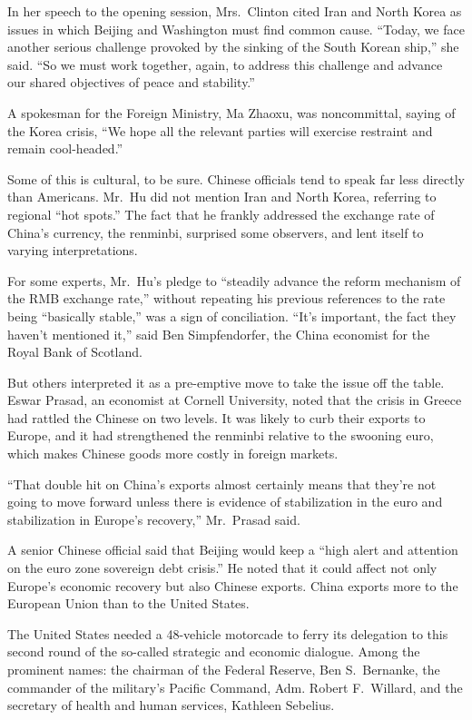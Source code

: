 ﻿\documentclass[12pt]{article}
\begin{document}
In her speech to the opening session, Mrs.~Clinton cited Iran and North Korea as issues in which
Beijing and Washington must find common cause. ``Today, we face another serious challenge provoked
by the sinking of the South Korean ship,'' she said. ``So we must work together, again, to address
this challenge and advance our shared objectives of peace and stability.''

A spokesman for the Foreign Ministry, Ma Zhaoxu, was noncommittal, saying of the Korea crisis, ``We
hope all the relevant parties will exercise restraint and remain cool-headed.''

Some of this is cultural, to be sure. Chinese officials tend to speak far less directly than
Americans. Mr.~Hu did not mention Iran and North Korea, referring to regional ``hot spots.'' The
fact that he frankly addressed the exchange rate of China's currency, the renminbi, surprised some
observers, and lent itself to varying interpretations.

For some experts, Mr.~Hu's pledge to ``steadily advance the reform mechanism of the RMB exchange
rate,'' without repeating his previous references to the rate being ``basically stable,'' was a sign
of conciliation. ``It's important, the fact they haven't mentioned it,'' said Ben Simpfendorfer, the
China economist for the Royal Bank of Scotland.

But others interpreted it as a pre-emptive move to take the issue off the table. Eswar Prasad, an
economist at Cornell University, noted that the crisis in Greece had rattled the Chinese on two
levels. It was likely to curb their exports to Europe, and it had strengthened the renminbi relative
to the swooning euro, which makes Chinese goods more costly in foreign markets.

``That double hit on China's exports almost certainly means that they're not going to move forward
unless there is evidence of stabilization in the euro and stabilization in Europe's recovery,''
Mr.~Prasad said.

A senior Chinese official said that Beijing would keep a ``high alert and attention on the euro zone
sovereign debt crisis.'' He noted that it could affect not only Europe's economic recovery but also
Chinese exports. China exports more to the European Union than to the United States.

The United States needed a 48-vehicle motorcade to ferry its delegation to this second round of the
so-called strategic and economic dialogue. Among the prominent names: the chairman of the Federal
Reserve, Ben S.~Bernanke, the commander of the military's Pacific Command, Adm. Robert F.~Willard,
and the secretary of health and human services, Kathleen Sebelius.
\end{document}
